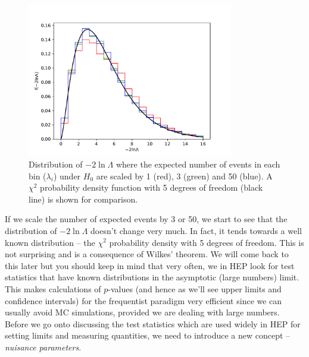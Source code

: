 \begin{figure}
    \centering
    \includegraphics[width=0.8\textwidth]{figures/Hypotest/gof_cf_chi2.pdf}
    \caption{Distribution of $-2\ln\Lambda$ where the expected number of events in each bin ($\lambda_{i}$) under $H_0$ are scaled by 1 (red), 3 (green) and 50 (blue). A $\chi^{2}$ probability density function with 5 degrees of freedom (black line) is shown for comparison.}
    \label{fig:gof_cf_chi2}
\end{figure}

If we scale the number of expected events by 3 or 50, we start to see that the distribution of $-2\ln\Lambda$ doesn't change very much. In fact, it tends towards a well known distribution -- the $\chi^{2}$ probability density with 5 degrees of freedom. This is not surprising and is a consequence of Wilkes' theorem. We will come back to this later but you should keep in mind that very often, we in HEP look for test statistics that have known distributions in the asymptotic (large numbers) limit. This makes calculations of $p$-values (and hence as we'll see upper limits and confidence intervals) for the frequentist paradigm very efficient since we can usually avoid MC simulations, provided we are dealing with large numbers. Before we go onto discussing the test statistics which are used widely in HEP for setting limits and measuring quantities, we need to introduce a new concept -- \emph{nuisance parameters}.
